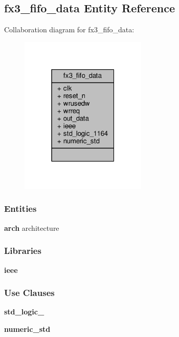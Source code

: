 \subsection{fx3\+\_\+fifo\+\_\+data Entity Reference}
\label{classfx3__fifo__data}


Collaboration diagram for fx3\+\_\+fifo\+\_\+data\+:\nopagebreak
\begin{figure}[H]
\begin{center}
\leavevmode
\includegraphics[width=171pt]{d7/d53/classfx3__fifo__data__coll__graph}
\end{center}
\end{figure}
\subsubsection*{Entities}
\begin{DoxyCompactItemize}
\item 
{\bf arch} architecture
\end{DoxyCompactItemize}
\subsubsection*{Libraries}
 \begin{DoxyCompactItemize}
\item 
{\bf ieee} 
\end{DoxyCompactItemize}
\subsubsection*{Use Clauses}
 \begin{DoxyCompactItemize}
\item 
{\bf std\+\_\+logic\+\_}   
\item 
{\bf numeric\+\_\+std}   
\end{DoxyCompactItemize}
